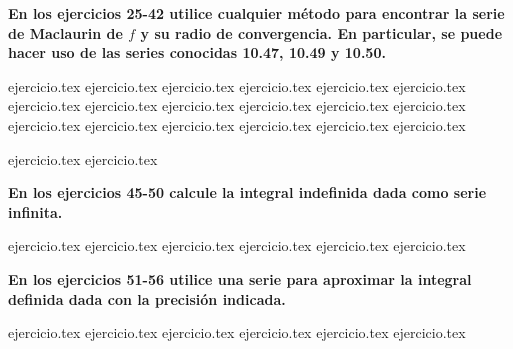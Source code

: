 \vspace{0.3cm}
\noindent\textbf{En los ejercicios 25-42 utilice cualquier método para encontrar la serie de Maclaurin de $f$ y su radio de convergencia. En particular, se puede hacer uso de las series conocidas 10.47, 10.49 y 10.50.}
\begin{enumerate}
    \setcounter{enumi}{24}
    {ejercicio.tex}
{ejercicio.tex}
{ejercicio.tex}
{ejercicio.tex}
{ejercicio.tex}
{ejercicio.tex}
{ejercicio.tex}
{ejercicio.tex}
{ejercicio.tex}
{ejercicio.tex}
{ejercicio.tex}
{ejercicio.tex}
{ejercicio.tex}
{ejercicio.tex}
{ejercicio.tex}
{ejercicio.tex}
{ejercicio.tex}
{ejercicio.tex}
\end{enumerate}

\vspace{0.3cm}
\begin{enumerate}
    \setcounter{enumi}{42}
    {ejercicio.tex}
{ejercicio.tex}
\end{enumerate}

\vspace{0.3cm}
\noindent\textbf{En los ejercicios 45-50 calcule la integral indefinida dada como serie infinita.}
\begin{enumerate}
    \setcounter{enumi}{44}
    {ejercicio.tex}
{ejercicio.tex}
{ejercicio.tex}
{ejercicio.tex}
{ejercicio.tex}
{ejercicio.tex}
\end{enumerate}

\vspace{0.3cm}
\noindent\textbf{En los ejercicios 51-56 utilice una serie para aproximar la integral definida dada con la precisión indicada.}
\begin{enumerate}
    \setcounter{enumi}{50}
    {ejercicio.tex}
{ejercicio.tex}
{ejercicio.tex}
{ejercicio.tex}
{ejercicio.tex}
{ejercicio.tex}
\end{enumerate}

